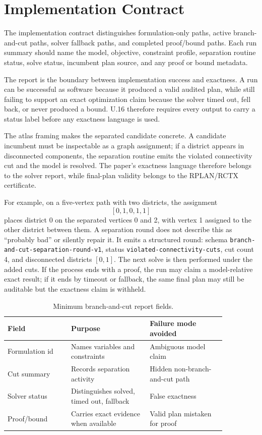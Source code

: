 \section{Implementation Contract}

The implementation contract distinguishes formulation-only paths, active
branch-and-cut paths, solver fallback paths, and completed proof/bound paths.
Each run summary should name the model, objective, constraint profile,
separation routine status, solve status, incumbent plan source, and any proof
or bound metadata.

The report is the boundary between implementation success and exactness. A run
can be successful as software because it produced a valid audited plan, while
still failing to support an exact optimization claim because the solver timed
out, fell back, or never produced a bound. U.16 therefore requires every output
to carry a status label before any exactness language is used.

The atlas framing makes the separated candidate concrete. A candidate incumbent
must be inspectable as a graph assignment; if a district appears in disconnected
components, the separation routine emits the violated connectivity cut and the
model is resolved. The paper's exactness language therefore belongs to the
solver report, while final-plan validity belongs to the RPLAN/RCTX certificate.

For example, on a five-vertex path with two districts, the assignment
\[
  [0,1,0,1,1]
\]
places district 0 on the separated vertices 0 and 2, with vertex 1 assigned to
the other district between them. A separation round does not describe this as
``probably bad'' or silently repair it. It emits a structured round: schema
\texttt{branch-and-cut-separation-round-v1}, status
\texttt{violated-connectivity-cuts}, cut count 4, and disconnected districts
\([0,1]\). The next solve is then performed under the added cuts. If the
process ends with a proof, the run may claim a model-relative exact result; if
it ends by timeout or fallback, the same final plan may still be auditable but
the exactness claim is withheld.

\begin{table}[htbp]
\centering
\small
\begin{tabular}{p{0.25\linewidth}p{0.31\linewidth}p{0.30\linewidth}}
\toprule
Field & Purpose & Failure mode avoided \\
\midrule
Formulation id & Names variables and constraints & Ambiguous model claim \\
Cut summary & Records separation activity & Hidden non-branch-and-cut path \\
Solver status & Distinguishes solved, timed out, fallback & False exactness \\
Proof/bound & Carries exact evidence when available & Valid plan mistaken for proof \\
\bottomrule
\end{tabular}
\caption{Minimum branch-and-cut report fields.}
\end{table}

